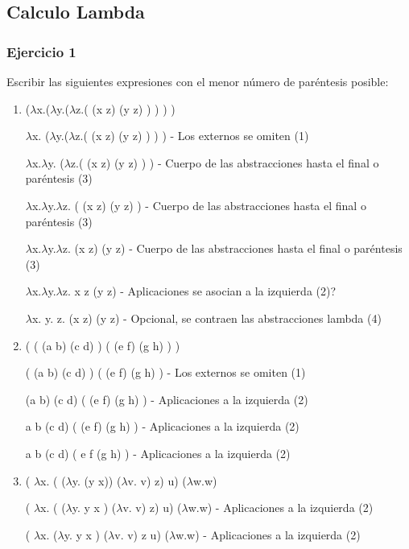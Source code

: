 \subsection{Calculo Lambda}
\subsubsection*{Ejercicio 1}
Escribir las siguientes expresiones con el menor número de paréntesis posible:

\begin{enumerate}[label=\alph*)]
    \item  ($\lambda$x.($\lambda$y.($\lambda$z.( (x z) (y z) ) ) ) )
    
    $\lambda$x. ($\lambda$y.($\lambda$z.( (x z) (y z) ) ) ) - Los externos se omiten (1)
    
    $\lambda$x.$\lambda$y. ($\lambda$z.( (x z) (y z) ) ) - Cuerpo de las abstracciones hasta el final o paréntesis (3)
    
    $\lambda$x.$\lambda$y.$\lambda$z. ( (x z) (y z) ) - Cuerpo de las abstracciones hasta el final o paréntesis (3)
    
     $\lambda$x.$\lambda$y.$\lambda$z. (x z) (y z) - Cuerpo de las abstracciones hasta el final o paréntesis (3)
    
    $\lambda$x.$\lambda$y.$\lambda$z. x z (y z) - Aplicaciones se asocian a la izquierda (2)? %
    
    $\lambda$x. y.  z. (x z) (y z) - Opcional, se contraen las abstracciones lambda (4)
    
    \item ( ( (a b) (c d) ) ( (e f) (g h) ) )
    
    ( (a b) (c d) ) ( (e f) (g h) ) - Los externos se omiten (1)
    
   (a b) (c d) ( (e f) (g h) )  - Aplicaciones a la izquierda (2)
    
    a b (c d) ( (e f) (g h) )  - Aplicaciones a la izquierda (2)
    
    a b (c d) ( e f (g h) )  - Aplicaciones a la izquierda (2) %
    
    \item ( $\lambda$x. ( ($\lambda$y. (y x)) ($\lambda$v. v) z) u) ($\lambda$w.w) 
    
    ( $\lambda$x. ( ($\lambda$y. y x ) ($\lambda$v. v) z) u) ($\lambda$w.w) - Aplicaciones a la izquierda (2)
    
    ( $\lambda$x. ($\lambda$y. y x ) ($\lambda$v. v) z u) ($\lambda$w.w) - Aplicaciones a la izquierda (2)

\end{enumerate}

